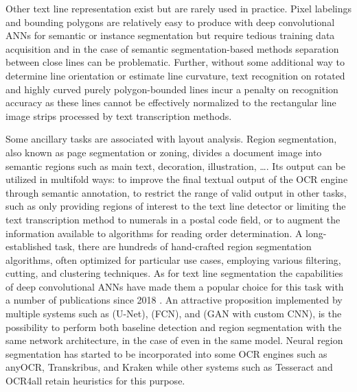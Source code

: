 Other text line representation exist but are rarely used in practice. Pixel
labelings and bounding polygons are relatively easy to produce with deep
convolutional ANNs for semantic \cite{pastor2016complete,alberti2019labeling}
or instance segmentation \cite{prusty2019indiscapes} but require tedious
training data acquisition and in the case of semantic segmentation-based
methods separation between close lines can be problematic. Further, without
some additional way to determine line orientation or estimate line curvature,
text recognition on rotated and highly curved purely polygon-bounded lines
incur a penalty on recognition accuracy as these lines cannot be effectively
normalized to the rectangular line image strips processed by text transcription
methods. 

Some ancillary tasks are associated with layout analysis. Region segmentation,
also known as page segmentation or zoning, divides a document image into
semantic regions such as main text, decoration, illustration, \dots. Its output
can be utilized in multifold ways: to improve the final textual output of the
OCR engine through semantic annotation, to restrict the range of valid output
in other tasks, such as only providing regions of interest to the text line
detector or limiting the text transcription method to numerals in a postal code
field, or to augment the information available to algorithms for reading order
determination. A long-established task, there are hundreds of hand-crafted
region segmentation algorithms, often optimized for particular use cases,
employing various filtering\cite{PAVLIDIS1992484},
cutting\cite{ha1995recursive,kruatrachue2005fast}, and
clustering\cite{drivas1995page,kise1998segmentation} techniques. As for text
line segmentation the capabilities of deep convolutional ANNs have made them a
popular choice for this task with a number of publications since 2018
\cite{wick2018fully,oliveira2018dhsegment,xu2018multi,quiros2018multi,he2017multi,chen2017convolutional,monnier2020docextractor}.
An attractive proposition implemented by multiple systems such as
\cite{oliveira2018dhsegment} (U-Net), \cite{xu2018multi} (FCN), and
\cite{quiros2018multi} (GAN with custom CNN), is the possibility to perform
both baseline detection and region segmentation with the same network
architecture, in the case of \cite{quiros2018multi,xu2018multi} even in the
same model. Neural region segmentation has started to be incorporated into some
OCR engines such as anyOCR\cite{bukhari2017anyocr}, Transkribus, and Kraken
while other systems such as Tesseract and OCR4all retain heuristics for this
purpose.

